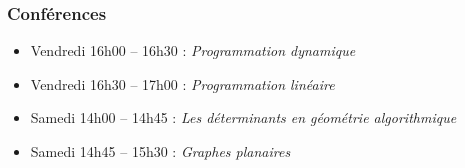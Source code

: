 \documentclass{beamer}
\begin{document}
\begin{frame}
    \frametitle{Conférences}
    \begin{itemize}
        \item Vendredi 16h00 -- 16h30 : \emph{Programmation dynamique}
        \item Vendredi 16h30 -- 17h00 : \emph{Programmation linéaire}
        \item Samedi 14h00 -- 14h45 : \emph{Les déterminants en géométrie
            algorithmique}
        \item Samedi 14h45 -- 15h30 : \emph{Graphes planaires}
    \end{itemize}
\end{frame}
\end{document}
